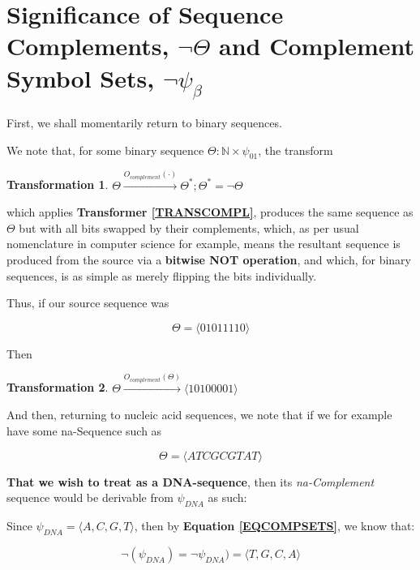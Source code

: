 \documentclass[a4paper, 18pt]{book} %
\newtheorem{trans}{Transformation}
\begin{document}
\section{Significance of Sequence Complements, $\lnot\Theta$ and Complement Symbol Sets, $\lnot\psi_\beta$}
\label{SECSIGCOMPLE}

First, we shall momentarily return to binary sequences. 

We note that, for some binary sequence $\Theta: \mathbb{N} \times \psi_{01}$, the transform

\begin{trans}
$\Theta \xrightarrow{O_{complement}(\cdot)} \Theta^*; \Theta^* = \lnot\Theta$
\end{trans}

which applies \textbf{Transformer \ref{TRANSCOMPL}}, produces the same sequence as $\Theta$ but with all bits swapped by their complements, which, as per usual nomenclature in computer science for example, means the resultant sequence is produced from the source via a \textbf{bitwise NOT operation}, and which, for binary sequences, is as simple as merely flipping the bits individually.

Thus, if our source sequence was 

\begin{equation}
\Theta = \langle 0 1 0 1 1 1 1 0 \rangle
\end{equation}

Then 

\begin{trans}
$\Theta \xrightarrow{O_{complement}(\Theta)}  \langle 1 0 1 0 0 0 0 1 \rangle$
\end{trans}

And then, returning to nucleic acid sequences, we note that if we for example have some na-Sequence such as 

\begin{equation}
\label{SEQATC}
\Theta = \langle A T C G C G T A T \rangle
\end{equation}

\textbf{That we wish to treat as a DNA-sequence}, then its \textit{na-Complement} sequence would be derivable from $\psi_{DNA}$ as such:

Since $\psi_{DNA} = \langle A, C, G, T \rangle$, then by \textbf{Equation \ref{EQCOMPSETS}}, we know that:

\begin{equation}
\lnot(\psi_{DNA}) = \lnot\psi_{DNA}) = \langle T, G, C, A \rangle
\end{equation}
\end{document}
